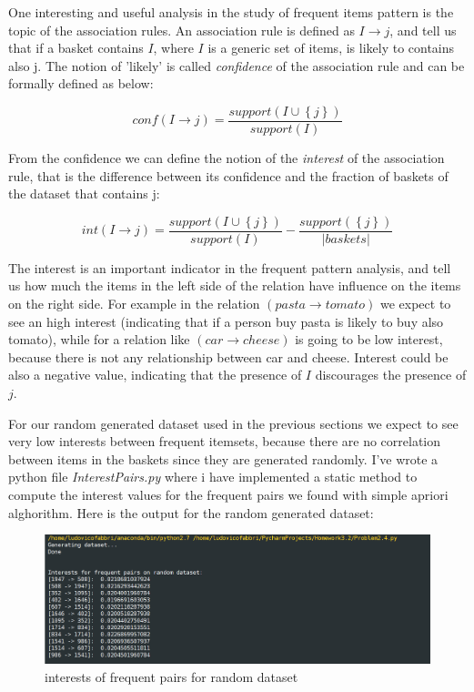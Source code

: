 \documentclass{article}
\begin{document}
One interesting and useful analysis in the study of frequent items pattern is the topic of the association rules.
An association rule is defined as $I \rightarrow j$, and tell us that if a basket contains $I$, where $I$ is a generic set of items, is likely to contains also j.
The notion of 'likely' is called \textit{confidence} of the association rule and can be formally defined as below:

$$ conf(I \rightarrow j) = \frac {support(I \cup \left\{ j \right\})} {support(I)}  $$

From the confidence we can define the notion of the \textit{interest} of the association rule, that is the difference between its confidence and the fraction of baskets of the dataset that contains j:

$$  int(I \rightarrow j) =  \frac {support(I \cup \left\{ j \right\})} {support(I)} - \frac{support(\left\{ j \right\})} {|baskets|} $$

The interest is an important indicator in the frequent pattern analysis, and tell us how much the items in the left side of the relation have influence on the items on the right side. 
For example in the relation $(pasta \rightarrow tomato)$ we expect to see an high interest (indicating that if a person buy pasta is likely to buy also tomato), while for a relation like
$(car \rightarrow cheese)$ is going to be low interest, because there is not any relationship between car and cheese. Interest could be also a negative value, indicating that the presence of $I$
discourages the presence of $j$.

For our random generated dataset used in the previous sections we expect to see very low interests between frequent itemsets, because there are no correlation between items in the baskets since they
are generated randomly.
I've wrote a python file \textit{InterestPairs.py} where i have implemented a static method to compute the interest values for the frequent pairs we found with simple apriori alghorithm.
Here is the output for the random generated dataset:

\newpage

\begin{figure} [h]
\centering
\includegraphics[width=150mm]{interestsRandom}
\caption{interests of frequent pairs for random dataset  \label{interestsRandom}}
\end{figure}
\end{document}
